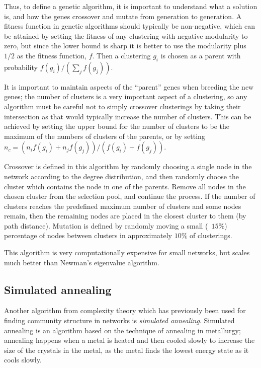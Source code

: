 Thus, to define a genetic algorithm, it is important to understand what a solution is, and how the genes crossover and mutate from generation to generation.  A fitness function in genetic algorithms should typically be non-negative, which can be attained by setting the fitness of any clustering with negative modularity to zero, but since the lower bound is sharp it is better to use the modularity plus $1/2$ as the fitness function, $f$. Then a clustering $g_i$ is chosen as a parent with probability $f(g_i)/(\sum_j f(g_j))$.

It is important to maintain aspects of the ``parent'' genes when breeding the new genes; the number of clusters is a very important aspect of a clustering, so any algorithm must be careful not to simply crossover clusterings by taking their intersection as that would typically increase the number of clusters.  This can be achieved by setting the upper bound for the number of clusters to be the maximum of the numbers of clusters of the parents, or by setting $n_c = \left(n_i f(g_i)+n_j f(g_j)\right)/(f(g_i)+f(g_j))$.

Crossover is defined in this algorithm by randomly choosing a single node in the network according to the degree distribution, and then randomly choose the cluster which contains the node in one of the parents.  Remove all nodes in the chosen cluster from the selection pool, and continue the process.  If the number of clusters reaches the predefined maximum number of clusters and some nodes remain, then the remaining nodes are placed in the closest cluster to them (by path distance).  Mutation is defined by randomly moving a small (~$15\%$) percentage of nodes between clusters in approximately $10\%$ of clusterings.

This algorithm is very computationally expensive for small networks, but scales much better than Newman's eigenvalue algorithm.

\subsection{Simulated annealing}

Another algorithm from complexity theory which has previously been used for finding community structure in networks is \emph{simulated annealing}.  Simulated annealing is an algorithm based on the technique of annealing in metallurgy; annealing happens when a metal is heated and then cooled slowly to increase the size of the crystals in the metal, as the metal finds the lowest energy state as it cools slowly.

